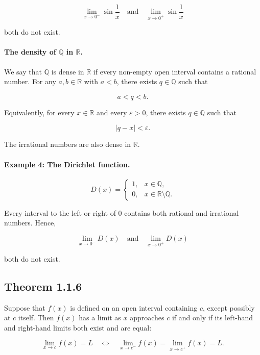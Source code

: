 \documentclass[11pt,a4paper]{article}
\begin{document}
\[
\lim_{x\to0^-}\sin\frac{1}{x}
\quad\text{and}\quad
\lim_{x\to0^+}\sin\frac{1}{x}
\]

both do not exist.

\paragraph{\texorpdfstring{The density of \(\mathbb{Q}\) in
\(\mathbb{R}\).}{The density of \textbackslash mathbb\{Q\} in \textbackslash mathbb\{R\}.}}\label{the-density-of-mathbbq-in-mathbbr.}

We say that \(\mathbb{Q}\) is dense in \(\mathbb{R}\) if every non-empty
open interval contains a rational number. For any \(a,b\in\mathbb{R}\)
with \(a<b\), there exists \(q\in\mathbb{Q}\) such that

\[
a<q<b.
\]

Equivalently, for every \(x\in\mathbb{R}\) and every \(\varepsilon>0\),
there exists \(q\in\mathbb{Q}\) such that

\[
|q-x|<\varepsilon.
\]

The irrational numbers are also dense in \(\mathbb{R}\).

\paragraph{Example 4: The Dirichlet
function.}\label{example-4-the-dirichlet-function.}

\[
D(x)=
\begin{cases}
1, & x\in\mathbb{Q},\\
0, & x\in\mathbb{R}\setminus\mathbb{Q}.
\end{cases}
\]

Every interval to the left or right of \(0\) contains both rational and
irrational numbers. Hence,

\[
\lim_{x\to0^-}D(x)
\quad\text{and}\quad
\lim_{x\to0^+}D(x)
\]

both do not exist.

\subsection{Theorem 1.1.6}\label{theorem-1.1.6}

Suppose that \(f(x)\) is defined on an open interval containing \(c\),
except possibly at \(c\) itself. Then \(f(x)\) has a limit as \(x\)
approaches \(c\) if and only if its left-hand and right-hand limits both
exist and are equal:

\[
\lim_{x\to c}f(x)=L
\quad\Longleftrightarrow\quad
\lim_{x\to c^-}f(x)=\lim_{x\to c^+}f(x)=L.
\]
\end{document}
